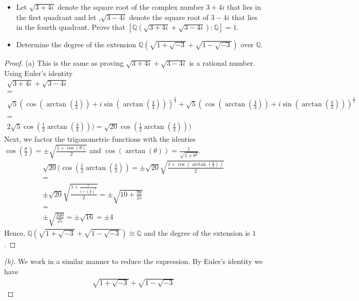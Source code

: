 \documentclass[10pt]{article}
\newcommand{\Q}{\mathbb{Q}}
\newenvironment{problem}[2][Problem]{\begin{trivlist}
		\item[\hskip \labelsep {\bfseries #1}\hskip \labelsep {\bfseries #2.}]}{\end{trivlist}}
\begin{document}
	\begin{problem}{2.11}
		\begin{itemize}
			\item[\textbf{(a)}] Let $\sqrt{3 + 4i}$ denote the square root of the complex number $3 + 4i$ that lies in the first quadrant and let ,$\sqrt{3-4i}$ denote the square root of $3 - 4i$ that lies in the fourth quadrant. Prove that $[\Q(\sqrt{3 + 4i} + \sqrt{3 - 4i}) : \Q ] = 1$.
			\item[\textbf{(b)}] Determine the degree of the extension $\Q(\sqrt{1 + \sqrt{-3}}+\sqrt{1-\sqrt{-3}})$ over $\Q$.
		\end{itemize}
		\begin{proof}{(a)}
			This is the same as proving $\sqrt{3 + 4i} + \sqrt{3 - 4i}$ is a rational number. Using Euler's identity
			\begin{gather*}
				\sqrt{3 + 4i} + \sqrt{3 - 4i} 
				\\=\\
				 \sqrt{5}(\cos(\arctan(\frac{4}{3})) + i\sin(\arctan(\frac{4}{3})))^\frac{1}{2} + \sqrt{5}(\cos(\arctan(\frac{4}{3})) + i\sin(\arctan(\frac{4}{3})))^\frac{1}{2}
				\\
				\\=\\
				2\sqrt{5} \cos(\frac{1}{2}\arctan(\frac{4}{3})))
				=
				\sqrt{20} \cos(\frac{1}{2}\arctan(\frac{4}{3})))
			\end{gather*}
			Next, we factor the trigonometric functions with the identies $\cos(\frac{\theta}{2}) = \pm \sqrt{\frac{1+\cos(\theta)}{2}}$ and $\cos(\arctan(\theta)) = \frac{1}{\sqrt{1+\theta^2}}$.
			\begin{gather*}
				\sqrt{20}(\cos(\frac{1}{2}\arctan(\frac{4}{3})) = \pm \sqrt{20}\sqrt{\frac{1+\cos(\arctan(\frac{4}{3}))}{2}}
				\\=\\
				\pm \sqrt{20}\sqrt{\frac{1+\frac{1}{1+(\frac{4}{3})^2}}{2}} = \pm \sqrt{10 + \frac{90}{25}}
				\\=\\
				\pm \sqrt{\frac{340}{25}} = \pm \sqrt{16} = \pm 4
			\end{gather*}
			Hence, $\Q(\sqrt{1 + \sqrt{-3}}+\sqrt{1-\sqrt{-3}}) \cong \Q$ and the degree of the extension is $1$.
		\end{proof}
		\begin{proof}[(b)]
			We work in a similar manner to reduce the expression. By Euler's identity we have
			\begin{gather*}
				\sqrt{1 + \sqrt{-3}}+\sqrt{1-\sqrt{-3}}

\end{gather*}
\end{proof}
\end{problem}
\end{document}
